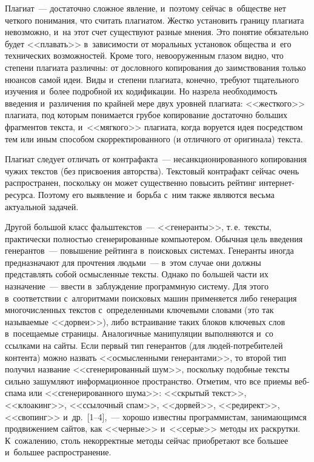 \begin{multicols}{2}
   Плагиат~--- достаточно сложное явление, и~поэтому сейчас в~обществе
нет четкого понимания, что считать плагиатом. Жестко установить границу
плагиата невозможно, и~на этот счет существуют разные мнения. Это
понятие обязательно будет <<плавать>> в~зависимости от моральных
установок общества и~его технических возможностей. Кроме того,
невооруженным глазом видно, что степени плагиата различны: от дословного
копирования до заимствования только нюансов самой идеи. Виды и~степени
плагиата, конечно, требуют тщательного изучения и~более подробной их
кодификации. Но назрела необходимость введения и~различения
по крайней мере двух уровней плагиата: <<жесткого>> плагиата, под
которым понимается грубое копирование достаточно больших фрагментов
текста, и~<<мягкого>> плагиата, когда воруется идея посредством тем или
иным способом скорректированного (и отличного от оригинала) текста.

   Плагиат следует отличать от контрафакта~--- несанкционированного
копирования чужих текстов (без присвоения авторства). Текстовый
контрафакт сейчас очень распространен, поскольку он может существенно
повысить рейтинг ин\-тер\-нет-ре\-сур\-са. Поэтому его выявление и~борьба
с~ним также являются весьма актуальной задачей.

   Другой большой класс фальштекстов~--- <<ге\-неранты>>, т.\,е.\ тексты,
практически полностью сгенерированные компьютером. Обычная цель
введения генерантов~--- повышение рейтинга \mbox{в~поисковых} системах.
Генеранты иногда предназначают для прочтения людьми~--- в~этом случае
они должны представлять собой осмысленные тексты. Однако по большей
части их назначение~--- ввести в~заблуждение программную систему. Для
этого в~соответствии с~алгоритмами поисковых машин применяется либо
генерация многочисленных текстов с~определенными ключевыми словами
(это так называемые <<дорвеи>>), либо встраивание таких блоков ключевых
слов в~посещаемые страницы. Аналогичные манипуляции выполняются
и~со ссылками на сайты. Если первый тип генерантов (для
   лю\-дей-по\-тре\-би\-те\-лей контента) можно назвать <<осмысленными
генерантами>>, то второй тип получил название <<сгенерированный шум>>,
поскольку подобные тексты сильно зашумляют информационное
пространство. Отметим, что все приемы веб-спа\-ма или <<сгенерированного
шума>>: <<скрытый текст>>, <<клоакинг>>, <<ссылочный спам>>,
<<дорвей>>, <<редирект>>, <<свопинг>> и~др.~[1--4],~--- хорошо
известны программистам, занимающимся продвижением сайтов, как
<<черные>> и~<<серые>> методы их раскрутки. К~сожалению, столь
некорректные методы сейчас приобретают все большее и~большее
распространение.


\end{multicols}
